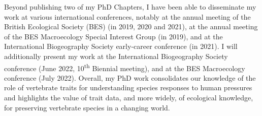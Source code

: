 Beyond publishing two of my PhD Chapters, I have been able to disseminate my work at various international conferences, notably at the annual meeting of the British Ecological Society (BES) (in 2019, 2020 and 2021), at the annual meeting of the BES Macroecology Special Interest Group (in 2019), and at the International Biogeography Society early-career conference (in 2021). I will additionally present my work at the International Biogeography Society conference (June 2022, 10\textsuperscript{th} Biennial meeting), and at the BES Macroecology conference (July 2022). Overall, my PhD work consolidates our knowledge of the role of vertebrate traits for understanding species responses to human pressures and highlights the value of trait data, and more widely, of ecological knowledge, for preserving vertebrate species in a changing world.